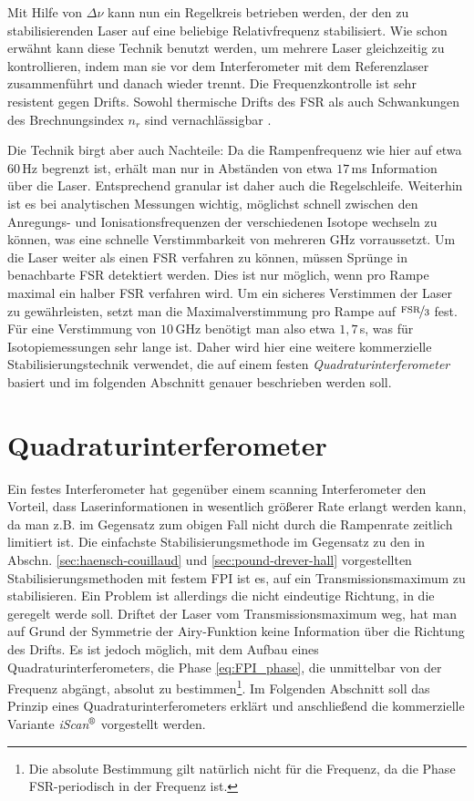 Mit Hilfe von $\Delta\nu$ kann nun ein Regelkreis betrieben werden, der den zu
stabilisierenden Laser auf eine beliebige Relativfrequenz stabilisiert. Wie
schon erwähnt kann diese Technik benutzt werden, um mehrere Laser
gleichzeitig zu kontrollieren, indem man sie vor dem Interferometer mit dem
Referenzlaser zusammenführt und danach wieder trennt. Die Frequenzkontrolle
ist sehr resistent gegen Drifts. Sowohl thermische Drifts des FSR als auch
Schwankungen des Brechnungsindex $n_r$ sind vernachlässigbar
\cite{kuschnick:2000:diplomarbeit}.\par
Die Technik birgt aber auch Nachteile: Da die Rampenfrequenz wie hier auf etwa
$60\,$Hz begrenzt ist, erhält man nur in Abständen von etwa $17\,$ms
Information über die Laser. Entsprechend granular ist daher auch die
Regelschleife. Weiterhin ist es bei analytischen Messungen wichtig, möglichst
schnell zwischen den Anregungs- und Ionisationsfrequenzen der verschiedenen
Isotope wechseln zu können, was eine schnelle Verstimmbarkeit von mehreren GHz
vorraussetzt. Um die Laser weiter als einen FSR verfahren zu können, müssen
Sprünge in benachbarte FSR detektiert werden. Dies ist nur möglich, wenn pro Rampe maximal ein halber FSR verfahren wird. Um ein sicheres
Verstimmen der Laser zu gewährleisten, setzt man die Maximalverstimmung pro
Rampe auf $\nicefrac{\text{FSR}}{3}$ fest. Für eine Verstimmung von $10\,$GHz benötigt
man also etwa $1,7\,$s, was für Isotopiemessungen sehr lange ist. Daher wird
hier eine weitere kommerzielle Stabilisierungstechnik verwendet, die auf einem festen
\textit{Quadraturinterferometer} basiert und im folgenden Abschnitt genauer
beschrieben werden soll.

\section{Quadraturinterferometer}\label{sec:quadraturinterferometer}
Ein festes Interferometer hat gegenüber einem scanning Interferometer den
Vorteil, dass Laserinformationen in wesentlich größerer Rate erlangt werden
kann, da man z.B. im Gegensatz zum obigen Fall nicht durch die Rampenrate
zeitlich limitiert ist. Die einfachste Stabilisierungsmethode im Gegensatz zu
den in Abschn.
\ref{sec:haensch-couillaud} und \ref{sec:pound-drever-hall} vorgestellten
Stabilisierungsmethoden mit festem FPI ist es, auf ein Transmissionsmaximum zu
stabilisieren. Ein Problem ist allerdings die nicht eindeutige Richtung, in die
geregelt werde soll. Driftet der Laser vom Transmissionsmaximum weg, hat man
auf Grund der Symmetrie der Airy-Funktion keine Information über die Richtung
des Drifts. Es ist jedoch möglich, mit dem Aufbau eines
Quadraturinterferometers, die Phase \eqref{eq:FPI_phase}, die unmittelbar von der Frequenz abgängt, absolut zu
bestimmen\footnote{Die absolute Bestimmung gilt natürlich nicht für die
Frequenz, da die Phase FSR-periodisch in der Frequenz ist.}. Im Folgenden
Abschnitt soll das Prinzip eines Quadraturinterferometers erklärt und
anschließend die kommerzielle Variante
\textit{iScan$^\text{\textregistered}$} vorgestellt werden.

